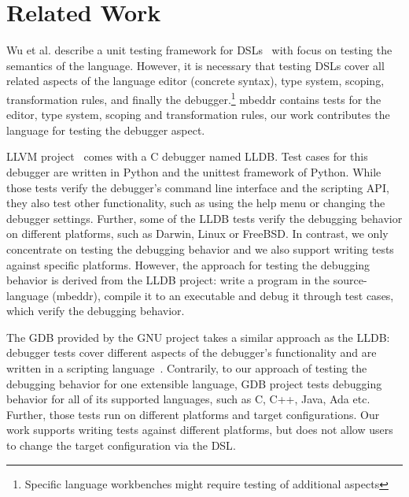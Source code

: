 \section{Related Work}

Wu et al. describe a unit testing framework for 
\acp{DSL}~\cite{DBLP:conf/dsl/WuGM09} with focus on
testing the semantics of the language.  However, it is necessary that testing
\acp{DSL} cover all related aspects of the language \eg editor
(concrete syntax), type system, scoping, transformation rules, and finally the
debugger.\footnote{Specific language workbenches might require
testing of additional aspects}
mbeddr contains tests for the editor, type system, scoping and transformation
rules, our work contributes the language for testing the debugger aspect.

\ac{LLVM} project~\cite{LLDB} comes with a C debugger named \ac{LLDB}.
Test cases for this debugger are written in Python
and the unittest framework of Python. While those tests verify the debugger’s
command line interface and the scripting API, they also test other
functionality, such as using the help menu or changing the debugger settings.
Further, some of the \ac{LLDB} tests verify the debugging behavior on different
platforms, such as Darwin, Linux or FreeBSD. In contrast, we only concentrate on
testing the debugging behavior and we also support writing tests against
specific platforms. However, the approach for testing the debugging behavior is
derived from the \ac{LLDB} project: write a program in the source-language (mbeddr),
compile it to an executable and debug it through test cases, which verify the
debugging behavior.

The \ac{GDB} provided by the GNU project takes a similar approach as
the \ac{LLDB}: debugger tests cover different aspects of the debugger’s
functionality and are written in a scripting language~\cite{gdb}.
Contrarily, to our approach of testing the debugging behavior 
for one extensible language, \ac{GDB} project tests
debugging behavior for all of its supported languages, such as C, C++, Java, Ada
etc. Further, those tests run on different platforms and target
configurations. Our work supports writing tests against different platforms, but
does not allow users to change the target configuration via the \ac{DSL}.
